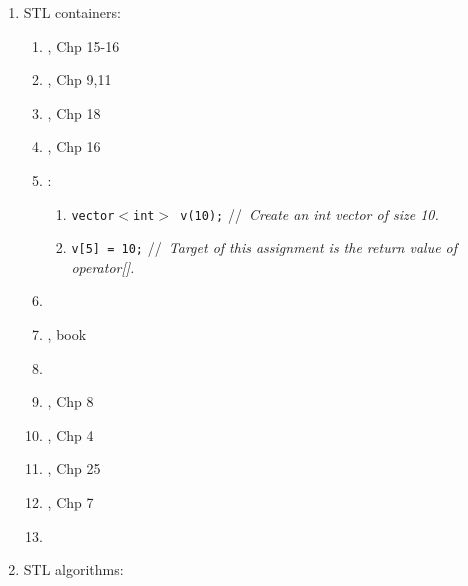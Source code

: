 \begin{enumerate}
\begin{enumerate}
	\item \cite[\S16.5, 983--996]{Gaddis2012}
	\item \cite{Josuttis2012}
	\item \cite[Chp. 18, pp. 943--998]{Savitch2009}
	\item \cite{Reese2006a}
	\item \cite[Chp. 16, pp. 877--922, 930--940]{Prata2005}
	\item \cite[Chp. 21, 499--545]{Schildt2003a}
	\item \cite{Robson2000}
	\item \cite{Josuttis1999a}
	\end{enumerate}
\item STL containers: \vspace{-0.3cm}
	\begin{enumerate} \itemsep -2pt
	\item \cite{Gregoire2014}, Chp 15-16
	\item \cite{Lippman2013}, Chp 9,11
	\item \cite{Allain2012}, Chp 18
	\item \cite{Prata2012}, Chp 16
	\item \cite{EliteHussar2010}: \vspace{-0.2cm}
		\begin{enumerate} \itemsep -2pt
		\item {\tt vector$<$int$>$ v(10);} \hspace{0.2in} //{\it\ Create an int vector of size 10.}
		\item {\tt v[5] = 10;} //{\it\ Target of this assignment is the return value of operator[].}
		\end{enumerate}
	\item \cite[\S18.2, pp. 960--977]{Savitch2009}
	\item \cite{Reese2006a}, book
	\item \cite[Chp. 8]{Scheinerman2006}
	\item \cite{Schildt2004a}, Chp 8
	\item \cite{Eckel2003}, Chp 4
	\item \cite{Oualline2003}, Chp 25
	\item \cite{Vermeir2001}, Chp 7
	\item \cite[Chp. 24, pp. 625--691; Chp. 25--38, pp. 695--927]{Schildt1998a}
	\end{enumerate}
\item STL algorithms: \vspace{-0.3cm}

\end{enumerate}
